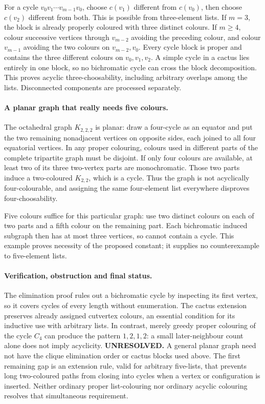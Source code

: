 \documentclass[11pt,a4paper]{article}
\begin{document}
For a cycle $v_0v_1\cdots v_{m-1}v_0$, choose $c(v_1)$ different
from $c(v_0)$, then choose $c(v_2)$ different from both. This is
possible from three-element lists. If $m=3$, the block is already
properly coloured with three distinct colours. If $m\ge4$, colour
successive vertices through $v_{m-2}$ avoiding the preceding colour,
and colour $v_{m-1}$ avoiding the two colours on $v_{m-2},v_0$.
Every cycle block is proper and contains the three different colours
on $v_0,v_1,v_2$. A simple cycle in a cactus lies entirely in one
block, so no bichromatic cycle can cross the block decomposition.
This proves acyclic three-choosability, including arbitrary overlaps
among the lists. Disconnected components are processed separately.

\paragraph{A planar graph that really needs five colours.}
The octahedral graph $K_{2,2,2}$ is planar: draw a four-cycle as an
equator and put the two remaining nonadjacent vertices on opposite
sides, each joined to all four equatorial vertices. In any proper
colouring, colours used in different parts of the complete tripartite
graph must be disjoint. If only four colours are available, at least
two of its three two-vertex parts are monochromatic. Those two parts
induce a two-coloured $K_{2,2}$, which is a cycle. Thus the graph is
not acyclically four-colourable, and assigning the same four-element
list everywhere disproves four-choosability.

Five colours suffice for this particular graph: use two distinct colours
on each of two parts and a fifth colour on the remaining part. Each
bichromatic induced subgraph then has at most three vertices, so cannot
contain a cycle. This example proves necessity of the proposed constant;
it supplies no counterexample to five-element lists.

\paragraph{Verification, obstruction and final status.}
The elimination proof rules out a bichromatic cycle by inspecting its
first vertex, so it covers cycles of every length without enumeration.
The cactus extension preserves already assigned cutvertex colours, an
essential condition for its inductive use with arbitrary lists.
In contrast, merely greedy proper colouring of the cycle $C_4$ can
produce the pattern $1,2,1,2$: a small later-neighbour count alone does
not imply acyclicity.
\textbf{UNRESOLVED.} A general planar graph need not have the clique
elimination order or cactus blocks used above. The first remaining gap
is an extension rule, valid for arbitrary five-lists, that prevents
long two-coloured paths from closing into cycles when a vertex or
configuration is inserted. Neither ordinary proper list-colouring nor
ordinary acyclic colouring resolves that simultaneous requirement.
\end{document}
